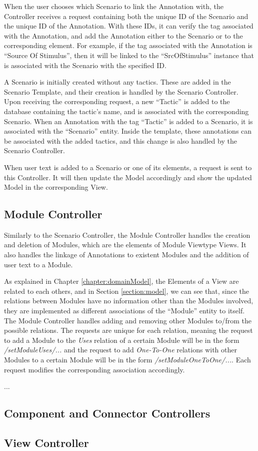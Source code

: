 When the user chooses which Scenario to link the Annotation with, the Controller receives a request containing both the unique ID of the Scenario and the unique ID of the Annotation. With these IDs, it can verify the tag associated with the Annotation, and add the Annotation either to the Scenario or to the corresponding element. For example, if the tag associated with the Annotation is ``Source Of Stimulus'', then it will be linked to the ``SrcOfStimulus'' instance that is associated with the Scenario with the specified ID.

A Scenario is initially created without any tactics. These are added in the Scenario Template, and their creation is handled by the Scenario Controller. Upon receiving the corresponding request, a new ``Tactic'' is added to the database containing the tactic's name, and is associated with the corresponding Scenario. When an Annotation with the tag ``Tactic'' is added to a Scenario, it is associated with the ``Scenario'' entity. Inside the template, these annotations can be associated with the added tactics, and this change is also handled by the Scenario Controller. 

When user text is added to a Scenario or one of its elements, a request is sent to this Controller. It will then update the Model accordingly and show the updated Model in the corresponding View.

\subsection{Module Controller}

Similarly to the Scenario Controller, the Module Controller handles the creation and deletion of Modules, which are the elements of Module Viewtype Views. It also handles the linkage of Annotations to existent Modules and the addition of user text to a Module.

As explained in Chapter \ref{chapter:domainModel}, the Elements of a View are related to each others, and in Section \ref{section:model}, we can see that, since the relations between Modules have no information other than the Modules involved, they are implemented as different associations of the ``Module'' entity to itself. The Module Controller handles adding and removing other Modules to/from the possible relations. The requests are unique for each relation, meaning the request to add a Module to the \textit{Uses} relation of a certain Module will be in the form \textit{/setModuleUses/...} and the request to add \textit{One-To-One} relations with other Modules to a certain Module will be in the form \textit{/setModuleOneToOne/...}. Each request modifies the corresponding association accordingly. 

...
\subsection{Component and Connector Controllers}

\subsection{View Controller}
\label{substection:viewController}
